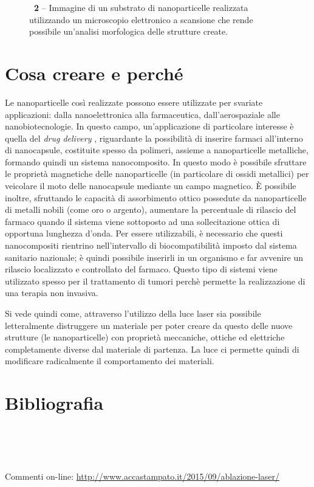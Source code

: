 \begin{figure}[!b]
\begin{center}
\caption{\textbf{\figurename~2} -- Immagine di un substrato di nanoparticelle realizzata utilizzando un microscopio elettronico a scansione che rende possibile un'analisi morfologica delle strutture create.
}
\label{fig:sem}
\end{center}
\vskip-20pt
\end{figure}

\section*{Cosa creare e perché}
Le nanoparticelle così realizzate possono essere utilizzate per svariate applicazioni: dalla nanoelettronica alla farmaceutica, dall'aerospaziale alle nanobiotecnologie. In questo campo, un'applicazione di particolare interesse è quella del \emph{drug delivery} \cite{Mora}, riguardante la possibilità di inserire farmaci all'interno di nanocapsule, costituite spesso da polimeri, assieme a nanoparticelle metalliche, formando quindi un sistema nanocomposito. In questo modo è possibile sfruttare le proprietà magnetiche delle nanoparticelle (in particolare di ossidi metallici) per veicolare il moto delle nanocapsule mediante un campo magnetico. È possibile inoltre, sfruttando le capacità di assorbimento ottico possedute da nanoparticelle di metalli nobili (come oro o argento), aumentare la percentuale di rilascio del farmaco quando il sistema viene sottoposto ad una sollecitazione ottica di opportuna lunghezza d'onda. Per essere utilizzabili, è necessario che questi nanocompositi rientrino nell'intervallo di biocompatibilità imposto dal sistema sanitario nazionale; è quindi possibile inserirli in un organismo e far avvenire un rilascio localizzato e controllato del farmaco. Questo tipo di sistemi viene utilizzato spesso per il trattamento di tumori perchè permette la realizzazione di una terapia non invasiva.

Si vede quindi come, attraverso l'utilizzo della luce laser sia possibile letteralmente distruggere un materiale per poter creare da questo delle nuove strutture (le nanoparticelle) con proprietà meccaniche, ottiche ed elettriche completamente diverse dal materiale di partenza. La luce ci permette quindi di modificare radicalmente il comportamento dei materiali.

\balance
\section*{Bibliografia}
\\
\\
\\

\smallskip
Commenti on-line: \url{http://www.accastampato.it/2015/09/ablazione-laser/}
